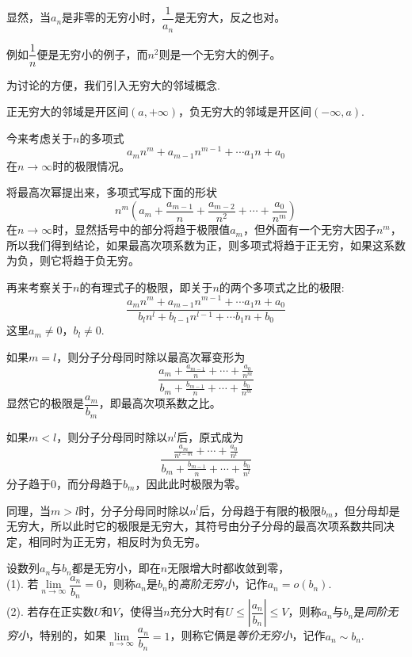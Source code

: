 显然，当$a_n$是非零的无穷小时，$\dfrac{1}{a_n}$是无穷大，反之也对。

例如$\dfrac{1}{n}$便是无穷小的例子，而$n^2$则是一个无穷大的例子。

为讨论的方便，我们引入无穷大的邻域概念.
\begin{definition}
  正无穷大的邻域是开区间$(a,+\infty)$，负无穷大的邻域是开区间$(-\infty,a)$.
\end{definition}

\begin{example}
  今来考虑关于$n$的多项式
  \[ a_mn^m+a_{m-1}n^{m-1} + \cdots a_1n+a_0 \]
  在$n \to \infty$时的极限情况。

  将最高次幂提出来，多项式写成下面的形状
  \[ n^m \left( a_m+\frac{a_{m-1}}{n}+\frac{a_{m-2}}{n^2} + \cdots + \frac{a_0}{n^m} \right) \]
  在$n \to \infty$时，显然括号中的部分将趋于极限值$a_m$，但外面有一个无穷大因子$n^m$，所以我们得到结论，如果最高次项系数为正，则多项式将趋于正无穷，如果这系数为负，则它将趋于负无穷。
\end{example}

\begin{example}
  再来考察关于$n$的有理式子的极限，即关于$n$的两个多项式之比的极限:
  \[ \frac{a_mn^m+a_{m-1}n^{m-1} + \cdots a_1n+a_0}{b_ln^l+b_{l-1}n^{l-1} + \cdots b_1n+b_0} \]
  这里$a_m \neq 0$，$b_l \neq 0$.

  如果$m=l$，则分子分母同时除以最高次幂变形为
  \[ \frac{a_m+\frac{a_{m-1}}{n}+\cdots+\frac{a_0}{n^m}}{b_m+\frac{b_{m-1}}{n}+\cdots+\frac{b_0}{n^m}} \]
  显然它的极限是$\dfrac{a_m}{b_m}$，即最高次项系数之比。

  如果$m<l$，则分子分母同时除以$n^l$后，原式成为
  \[ \frac{\frac{a_m}{n^{l-m}}+\cdots+\frac{a_0}{n^l}}{b_m+\frac{b_{m-1}}{n}+\cdots+\frac{b_0}{n^l}} \]
  分子趋于$0$，而分母趋于$b_m$，因此此时极限为零。

  同理，当$m>l$时，分子分母同时除以$n^l$后，分母趋于有限的极限$b_m$，但分母却是无穷大，所以此时它的极限是无穷大，其符号由分子分母的最高次项系数共同决定，相同时为正无穷，相反时为负无穷。
\end{example}

\begin{definition}
   设数列$a_n$与$b_n$都是无穷小，即在$n$无限增大时都收敛到零，\\
  (1). 若$\lim\limits_{n \to \infty} \dfrac{a_n}{b_n} = 0$，则称$a_n$是$b_n$的\emph{高阶无穷小}，记作$a_n=o(b_n)$. \\
  (2). 若存在正实数$U$和$V$，使得当$n$充分大时有$U\leqslant \left| \dfrac{a_n}{b_n} \right| \leqslant V$，则称$a_n$与$b_n$是\emph{同阶无穷小}，特别的，如果$\lim\limits_{n \to \infty} \dfrac{a_n}{b_n} = 1$，则称它俩是\emph{等价无穷小}，记作$a_n \sim b_n$.
\end{definition}

